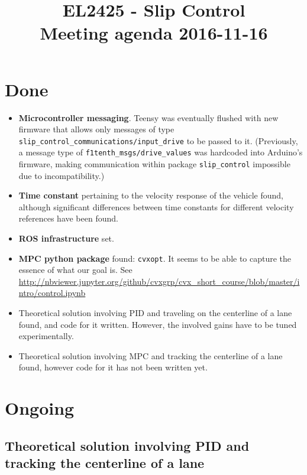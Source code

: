 \documentclass[oneside,12pt]{article}
\title{EL2425 - Slip Control \\ Meeting agenda 2016-11-16}
\begin{document}
\maketitle

\section{Done}

\begin{itemize}

  \item \textbf{Microcontroller messaging}. Teensy was eventually flushed with
    new firmware that allows only messages of type
    \texttt{slip\_control\_communications/input\_drive} to be passed to it.
    (Previously, a message type of \texttt{f1tenth\_msgs/drive\_values}
    was hardcoded into Arduino's firmware, making communication within package
    \texttt{slip\_control} impossible due to incompatibility.)

  \item \textbf{Time constant} pertaining to the velocity response of the vehicle
    found, although significant differences between time constants
    for different velocity references have been found.

  \item \textbf{ROS infrastructure} set.

  \item \textbf{MPC python package} found: \texttt{cvxopt}. It seems to be able to
    capture the essence of what our goal is.
    See \url{http://nbviewer.jupyter.org/github/cvxgrp/cvx_short_course/blob/master/intro/control.ipynb}

  \item Theoretical solution involving PID and traveling on the centerline of a
    lane found, and code for it written. However, the involved gains
    have to be tuned experimentally.

  \item Theoretical solution involving MPC and tracking the centerline of a lane
    found, however code for it has not been written yet.

\end{itemize}



\section{Ongoing}

  \subsection{Theoretical solution involving PID and tracking the centerline of a lane}
\end{document}
